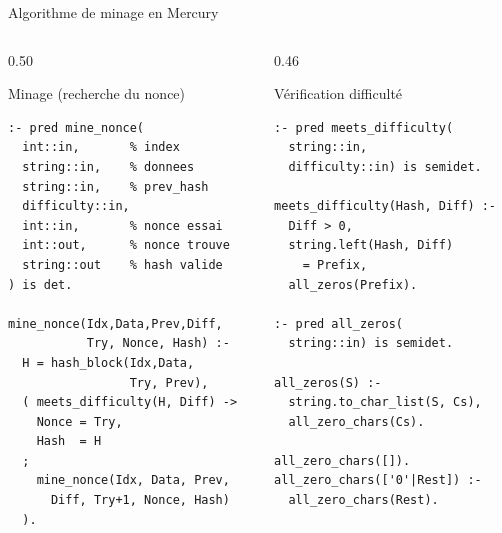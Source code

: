 \documentclass[aspectratio=169,12pt]{beamer}
\begin{document}
\begin{frame}[fragile]{\faHammer\quad Algorithme de minage en Mercury}
  \begin{columns}[T]
    \begin{column}{0.50\textwidth}
      \begin{exampleblock}{Minage (recherche du nonce)}
\begin{lstlisting}
:- pred mine_nonce(
  int::in,       % index
  string::in,    % donnees
  string::in,    % prev_hash
  difficulty::in,
  int::in,       % nonce essai
  int::out,      % nonce trouve
  string::out    % hash valide
) is det.

mine_nonce(Idx,Data,Prev,Diff,
           Try, Nonce, Hash) :-
  H = hash_block(Idx,Data,
                 Try, Prev),
  ( meets_difficulty(H, Diff) ->
    Nonce = Try,
    Hash  = H
  ;
    mine_nonce(Idx, Data, Prev,
      Diff, Try+1, Nonce, Hash)
  ).
\end{lstlisting}
      \end{exampleblock}
    \end{column}
    \begin{column}{0.46\textwidth}
      \begin{exampleblock}{Vérification difficulté}
\begin{lstlisting}
:- pred meets_difficulty(
  string::in,
  difficulty::in) is semidet.

meets_difficulty(Hash, Diff) :-
  Diff > 0,
  string.left(Hash, Diff)
    = Prefix,
  all_zeros(Prefix).

:- pred all_zeros(
  string::in) is semidet.

all_zeros(S) :-
  string.to_char_list(S, Cs),
  all_zero_chars(Cs).

all_zero_chars([]).
all_zero_chars(['0'|Rest]) :-
  all_zero_chars(Rest).
\end{lstlisting}
      \end{exampleblock}
    \end{column}
  \end{columns}
\end{frame}
\end{document}
